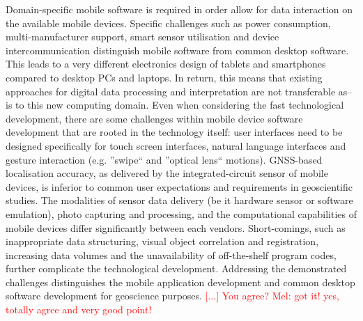 \documentclass[review]{elsarticle}
\begin{document}

Domain-specific mobile software is required in order allow for data interaction on the available mobile devices. Specific challenges such as power consumption, multi-manufacturer support, smart sensor utilisation and device intercommunication distinguish mobile software from common desktop software. This leads to a very different electronics design of tablets and smartphones compared to desktop PCs and laptops. In return, this means that existing approaches for digital data processing and interpretation are not transferable as--is to this new computing domain. Even when considering the fast technological development, there are some challenges within mobile device software development that are rooted in the technology itself: user interfaces need to be designed specifically for touch screen interfaces, natural language interfaces and gesture interaction (e.g. ''swipe`` and ''optical lens`` motions). \Gls{GNSS}-based localisation accuracy, as delivered by the integrated-circuit sensor of mobile devices, is inferior to common user expectations and requirements in geoscientific studies. The modalities of sensor data delivery (be it hardware sensor or software emulation), photo capturing and processing, and the computational capabilities of mobile devices differ significantly between each vendors. Short-comings, such as inappropriate data structuring, visual object correlation and registration, increasing data volumes and the unavailability of off-the-shelf program codes, further complicate the technological development. Addressing the demonstrated challenges distinguishes the mobile application development and common desktop software development for geoscience purposes. \textcolor{red}{[...] You agree? Mel: got it! yes, totally agree and very good point!}
\end{document}
